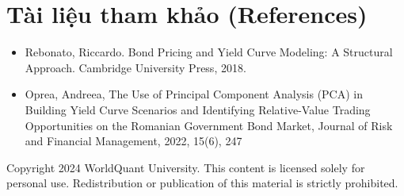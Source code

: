 \section*{Tài liệu tham khảo (References)}
\begin{itemize}
    \item Rebonato, Riccardo. Bond Pricing and Yield Curve Modeling: A Structural Approach. Cambridge University Press, 2018.
    \item Oprea, Andreea, The Use of Principal Component Analysis (PCA) in Building Yield Curve Scenarios and Identifying Relative-Value Trading Opportunities on the Romanian Government Bond Market, Journal of Risk and Financial Management, 2022, 15(6), 247
\end{itemize}

Copyright 2024 WorldQuant University. This content is licensed solely for personal use. Redistribution or publication of this material is strictly prohibited.

